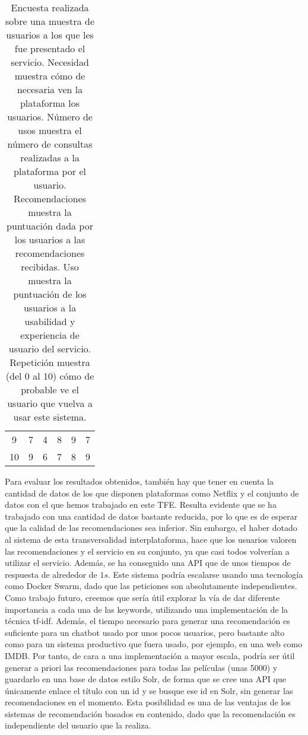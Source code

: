 \begin{table}[h]
{\begin{tabular}{cccccc}
9                                     & 7                                       & 4                                            & 8                                             & 9                                 & 7                                       \\
10                                    & 9                                       & 6                                            & 7                                             & 8                                 & 9                                      
\end{tabular}%
}
\caption{Encuesta realizada sobre una muestra de usuarios a los que les fue presentado el servicio. Necesidad muestra cómo de necesaria ven la plataforma los usuarios. Número de usos muestra el número de consultas realizadas a la plataforma por el usuario. Recomendaciones muestra la puntuación dada por los usuarios a las recomendaciones recibidas. Uso muestra la puntuación de los usuarios a la usabilidad y experiencia de usuario del servicio. Repetición muestra (del 0 al 10) cómo de probable ve el usuario que vuelva a usar este sistema.}
\label{tab:satisfaction}
\end{table}

Para evaluar los resultados obtenidos, también hay que tener en cuenta la cantidad de datos de los que disponen plataformas como Netflix y el conjunto de datos con el que hemos trabajado en este TFE. Resulta evidente que se ha trabajado con una cantidad de datos bastante reducida, por lo que es de esperar que la calidad de las recomendaciones sea inferior. Sin embargo, el haber dotado al sistema de esta transversalidad interplataforma, hace que los usuarios valoren las recomendaciones y el servicio en su conjunto, ya que casi todos volverían a utilizar el servicio. Además, se ha conseguido una API que de unos tiempos de respuesta de alrededor de $1 s$. Este sistema podría escalarse usando una tecnología como Docker Swarm, dado que las peticiones son absolutamente independientes.\\

Como trabajo futuro, creemos que sería útil explorar la vía de dar diferente importancia a cada una de las keywords, utilizando una implementación de la técnica tf-idf. Además, el tiempo necesario para generar una recomendación es suficiente para un chatbot usado por unos pocos usuarios, pero bastante alto como para un sistema productivo que fuera usado, por ejemplo, en una web como IMDB. Por tanto, de cara a una implementación a mayor escala, podría ser útil generar a priori las recomendaciones para todas las películas (unas 5000) y guardarlo en una base de datos estilo Solr, de forma que se cree una API que únicamente enlace el título con un id y se busque ese id en Solr, sin generar las recomendaciones en el momento. Esta posibilidad es una de las ventajas de los sistemas de recomendación basados en contenido, dado que la recomendación es independiente del usuario que la realiza.

